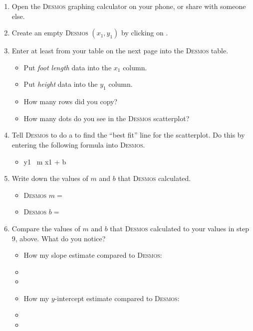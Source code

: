 \documentclass[12pt,letterpaper]{memoir}
\begin{document}
\begin{enumerate}[fullwidth,label={\Large$\bm{\square}$}\,\arabic*.,resume]
    \item Open the {\scshape Desmos} graphing calculator on your phone, or share with someone else.
    \item Create an empty {\scshape Desmos} $(x_1,y_1)$  by clicking on \fbox{\Large +}.
    \item Enter at least  from your table on the next page into the {\scshape Desmos} table.
        \begin{itemize}
            \item Put {\itshape foot length} data into the $x_1$ column.
            \item Put {\itshape height} data into the $y_1$ column.
            \item How many rows did you copy? \underline{\hspace{1in}}
            \item How many dots do you see in the {\scshape Desmos} scatterplot? \underline{\hspace{1in}}
        \end{itemize}
    \item Tell {\scshape Desmos} to do a  
        to find the ``best fit'' line for the scatterplot.
        Do this by entering the following formula into {\scshape Desmos}.
        \begin{itemize}
            \item {\ttfamily y1 \raisebox{0.25em}{\large\texttildelow}\, m x1  +  b}
        \end{itemize}
    \item Write down the values of $m$ and $b$ that {\scshape Desmos} calculated.
        \begin{itemize}
            \item {\scshape Desmos} $m =$ \underline{\hspace{0.5in}}
            \item {\scshape Desmos} $b =$ \underline{\hspace{0.5in}}
        \end{itemize}
\item Compare the values of $m$ and $b$ that {\scshape Desmos} calculated 
        to your values in step 9, above. What do you notice?
        \begin{itemize}
            \item How my slope estimate compared to {\scshape Desmos}: \hrulefill
            \item[] \hrulefill
            \item[] \hrulefill
            \item How my $y$-intercept estimate compared to {\scshape Desmos}: \hrulefill
            \item[] \hrulefill
            \item[] \hrulefill
        \end{itemize}
\end{enumerate}
\end{document}
